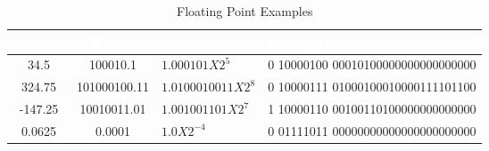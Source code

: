 \begin{table}[H]
  \small
  \sffamily
  {\footnotesize }
  \newcommand{\head}[1]{\textcolor{white}{\textbf{#1}}}    
  \begin{center}
    \begin{tabular}{ S S l l } 
      \hline
      \head{{\footnotesize Decimal}} & \head{{\footnotesize Binary}} & \head{{\footnotesize Normalized}} & \head{{\footnotesize Floating Point}} \\
      \hline
      {\footnotesize 34.5}    & {\footnotesize 100010.1} & {\footnotesize $ 1.000101 X 2^5 $} &
      {\footnotesize 0 10000100 00010100000000000000000} \\
      {\footnotesize 324.75}  & {\footnotesize 101000100.11} & {\footnotesize $ 1.0100010011 X 2^8 $} &
      {\footnotesize 0 10000111 01000100010000111101100} \\
      {\footnotesize -147.25} & {\footnotesize 10010011.01} & {\footnotesize $ 1.001001101 X 2^7 $} &
      {\footnotesize 1 10000110 00100110100000000000000} \\
      {\footnotesize 0.0625}  & {\footnotesize 0.0001} & {\footnotesize $ 1.0 X 2^{-4} $} &
      {\footnotesize 0 01111011 00000000000000000000000} \\ \hline
    \end{tabular}
  \end{center}
  \caption{Floating Point Examples}
  \label{MF:tab:floating_point_example}
\end{table} 
